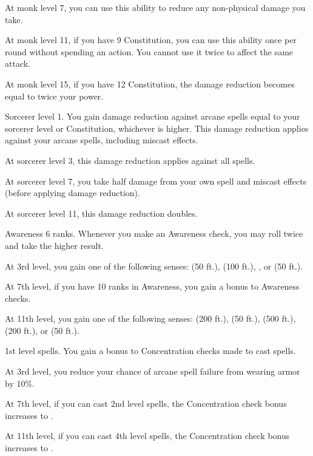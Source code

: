    At monk level 7, you can use this ability to reduce any non-physical damage you take.

    At monk level 11, if you have 9 Constitution, you can use this ability once per round without spending an action.
    You cannot use it twice to affect the same attack.

    At monk level 15, if you have 12 Constitution, the damage reduction becomes equal to twice your \ki power.

    \featpre Sorcerer level 1.
    \featben You gain damage reduction against arcane spells equal to your sorcerer level or Constitution, whichever is higher.
    This damage reduction applies against your arcane spells, including miscast effects.

    At sorcerer level 3, this damage reduction applies against all spells.

    At sorcerer level 7, you take half damage from your own spell and miscast effects (before applying damage reduction).

    At sorcerer level 11, this damage reduction doubles.

    \featpre Awareness 6 ranks.
    \featben Whenever you make an Awareness check, you may roll twice and take the higher result.

    At 3rd level, you gain one of the following senses:  (50 ft.),  (100 ft.), , or  (50 ft.).

    At 7th level, if you have 10 ranks in Awareness, you gain a  bonus to Awareness checks.

    At 11th level, you gain one of the following senses:  (200 ft.),  (50 ft.),  (500 ft.),  (200 ft.), or  (50 ft.).

    \featpre 1st level spells.
    \featben You gain a  bonus to Concentration checks made to cast spells.

    At 3rd level, you reduce your chance of arcane spell failure from wearing armor by 10\%.

    At 7th level, if you can cast 2nd level spells, the Concentration check bonus increases to .

    At 11th level, if you can cast 4th level spells, the Concentration check bonus increases to .

